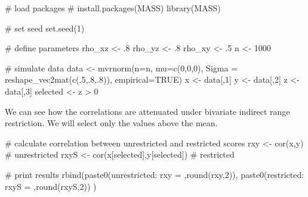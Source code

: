 \documentclass[
  letterpaper,
  DIV=11,
  numbers=noendperiod]{scrreprt}
\newenvironment{Shaded}{\begin{snugshade}}{\end{snugshade}}
\newcommand{\AttributeTok}[1]{\textcolor[rgb]{0.40,0.45,0.13}{#1}}
\newcommand{\CommentTok}[1]{\textcolor[rgb]{0.37,0.37,0.37}{#1}}
\newcommand{\ConstantTok}[1]{\textcolor[rgb]{0.56,0.35,0.01}{#1}}
\newcommand{\DecValTok}[1]{\textcolor[rgb]{0.68,0.00,0.00}{#1}}
\newcommand{\FunctionTok}[1]{\textcolor[rgb]{0.28,0.35,0.67}{#1}}
\newcommand{\NormalTok}[1]{\textcolor[rgb]{0.00,0.23,0.31}{#1}}
\newcommand{\OtherTok}[1]{\textcolor[rgb]{0.00,0.23,0.31}{#1}}
\newcommand{\SpecialCharTok}[1]{\textcolor[rgb]{0.37,0.37,0.37}{#1}}
\newcommand{\StringTok}[1]{\textcolor[rgb]{0.13,0.47,0.30}{#1}}
\begin{document}
\begin{Shaded}
\begin{Highlighting}[]
\CommentTok{\# load packages}
\CommentTok{\# install.packages(\textquotesingle{}MASS\textquotesingle{})}
\FunctionTok{library}\NormalTok{(MASS)}

\CommentTok{\# set seed}
\FunctionTok{set.seed}\NormalTok{(}\DecValTok{1}\NormalTok{)}

\CommentTok{\# define parameters}
\NormalTok{rho\_xz }\OtherTok{\textless{}{-}}\NormalTok{ .}\DecValTok{8}
\NormalTok{rho\_yz }\OtherTok{\textless{}{-}}\NormalTok{ .}\DecValTok{8}
\NormalTok{rho\_xy }\OtherTok{\textless{}{-}}\NormalTok{ .}\DecValTok{5}
\NormalTok{n }\OtherTok{\textless{}{-}} \DecValTok{1000}

\CommentTok{\# simulate data}
\NormalTok{data }\OtherTok{\textless{}{-}} \FunctionTok{mvrnorm}\NormalTok{(}\AttributeTok{n=}\NormalTok{n,}
                \AttributeTok{mu=}\FunctionTok{c}\NormalTok{(}\DecValTok{0}\NormalTok{,}\DecValTok{0}\NormalTok{,}\DecValTok{0}\NormalTok{),}
                \AttributeTok{Sigma =} \FunctionTok{reshape\_vec2mat}\NormalTok{(}\FunctionTok{c}\NormalTok{(.}\DecValTok{5}\NormalTok{,.}\DecValTok{8}\NormalTok{,.}\DecValTok{8}\NormalTok{)),}
                \AttributeTok{empirical=}\ConstantTok{TRUE}\NormalTok{)}
\NormalTok{x }\OtherTok{\textless{}{-}}\NormalTok{ data[,}\DecValTok{1}\NormalTok{]}
\NormalTok{y }\OtherTok{\textless{}{-}}\NormalTok{ data[,}\DecValTok{2}\NormalTok{]}
\NormalTok{z }\OtherTok{\textless{}{-}}\NormalTok{ data[,}\DecValTok{3}\NormalTok{]}
\NormalTok{selected }\OtherTok{\textless{}{-}}\NormalTok{ z }\SpecialCharTok{\textgreater{}} \DecValTok{0}
\end{Highlighting}
\end{Shaded}

We can see how the correlations are attenuated under bivariate indirect
range restriction. We will select only the values above the mean.

\begin{Shaded}
\begin{Highlighting}[]
\CommentTok{\# calculate correlation between unrestricted and restricted scores}
\NormalTok{rxy }\OtherTok{\textless{}{-}} \FunctionTok{cor}\NormalTok{(x,y) }\CommentTok{\# unrestricted}
\NormalTok{rxyS }\OtherTok{\textless{}{-}} \FunctionTok{cor}\NormalTok{(x[selected],y[selected]) }\CommentTok{\# restricted}

\CommentTok{\# print results}
\FunctionTok{rbind}\NormalTok{(}\FunctionTok{paste0}\NormalTok{(}\StringTok{\textquotesingle{}unrestricted: rxy = \textquotesingle{}}\NormalTok{,}\FunctionTok{round}\NormalTok{(rxy,}\DecValTok{2}\NormalTok{)),}
      \FunctionTok{paste0}\NormalTok{(}\StringTok{\textquotesingle{}restricted: rxyS = \textquotesingle{}}\NormalTok{,}\FunctionTok{round}\NormalTok{(rxyS,}\DecValTok{2}\NormalTok{))}
\NormalTok{      )}
\end{Highlighting}
\end{Shaded}
\end{document}
